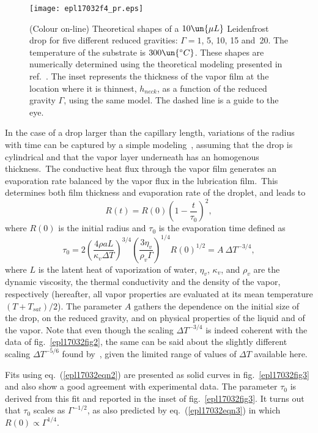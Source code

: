 \documentclass[doublecol,final]{epl2}
\begin{document}
\begin{figure}%
\centering
\texttt{[image: epl17032f4\_pr.eps]}
\caption{(Colour on-line) Theoretical shapes of a $10\un{\mu L}$ Leidenfrost drop for five different reduced gravities: $\Gamma=1$, 5, 10, 15 and~20. The temperature of the substrate is $300\un{^\circ C}$. These shapes are numerically determined using the theoretical modeling presented in ref.~\cite{epl17032bib8}. The inset represents the thickness of the vapor film at the location where it is thinnest, $h_{\textit{neck}}$, as a function of the reduced gravity $\Gamma$, using the same model. The dashed line is a guide to the eye.}
\label{epl17032fig4}
\end{figure}

In the case of a drop larger than the capillary length, variations of the radius with time can be captured by a simple modeling~\cite{epl17032bib3}, assuming that the drop is cylindrical and that the vapor layer underneath has an homogenous thickness.~The conductive heat flux through the vapor film generates an evaporation rate balanced by the vapor flux in the lubrication film.~This determines both film thickness and evaporation rate of the droplet, and leads to
\begin{equation}%
R(t)=R(0)\left(1-\frac{t}{\tau_0}\right)^2, \label{epl17032eqn2}
\end{equation}
where $R(0)$ is the initial radius and $\tau_0$ is the evaporation time defined as
\begin{equation}%
\tau_0=2\left(\frac{4\rho aL}{\kappa_v\Delta T}\right)^{3/4}\left(\frac{3\eta_v}{\rho_v \Gamma}\right)^{1/4}{R(0)}^{1/2}={A\ \Delta T^{-3/4}}, \label{epl17032eqn3}
\end{equation}
where $L$ is the latent heat of vaporization of water, $\eta_v$, $\kappa_v$, and $\rho_v$ are the dynamic viscosity, the thermal conductivity and the density of the vapor, respectively (hereafter, all vapor properties are evaluated at its mean temperature $(T+T_{\textit{sat}})/2$). The parameter $A$ gathers the dependence on the initial size of the drop, on the reduced gravity, and on physical properties of the liquid and of the vapor. Note that even though the scaling $\Delta T^{-3/4}$ is indeed coherent with the data of fig.~\ref{epl17032fig2}, the same can be said about the slightly different scaling $\Delta T^{-5/6}$ found by~\cite{epl17032bib8}, given the limited range of values of $\Delta T$ available here.

Fits using eq.~(\ref{epl17032eqn2}) are presented as solid curves in fig.~\ref{epl17032fig3} and also show a good agreement with experimental data. The parameter $\tau_{0}$ is derived from this fit and reported in the inset of fig.~\ref{epl17032fig3}. It turns out that $\tau_{0}$ scales as $\Gamma^{-1/2}$, as also predicted by eq.~(\ref{epl17032eqn3}) in which $R(0) \propto \Gamma^{1/4}$.
\end{document}
